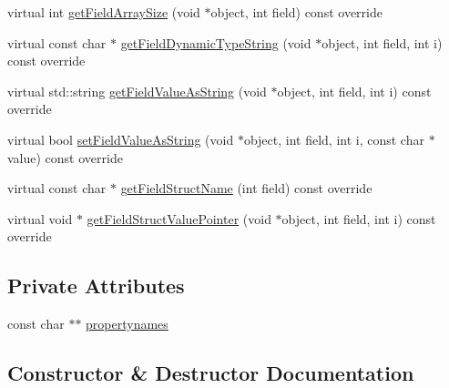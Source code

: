 \begin{DoxyCompactItemize}
\item 
virtual int \hyperlink{class_app_msg_false_dep_descriptor_a179d2851182b7e2c778befc442640361}{get\+Field\+Array\+Size} (void $\ast$object, int field) const override
\item 
virtual const char $\ast$ \hyperlink{class_app_msg_false_dep_descriptor_a18f649fae5364f7b9f326fd1ae9afb6d}{get\+Field\+Dynamic\+Type\+String} (void $\ast$object, int field, int i) const override
\item 
virtual std\+::string \hyperlink{class_app_msg_false_dep_descriptor_ac9b26b1e9c849df0e0259dfa3a38885c}{get\+Field\+Value\+As\+String} (void $\ast$object, int field, int i) const override
\item 
virtual bool \hyperlink{class_app_msg_false_dep_descriptor_ad7f784c5c9c941292342602674c4b9e4}{set\+Field\+Value\+As\+String} (void $\ast$object, int field, int i, const char $\ast$value) const override
\item 
virtual const char $\ast$ \hyperlink{class_app_msg_false_dep_descriptor_aa44a321c042bf2af6eff2f92ad52f73d}{get\+Field\+Struct\+Name} (int field) const override
\item 
virtual void $\ast$ \hyperlink{class_app_msg_false_dep_descriptor_a2975e01f5455360c1954f722dfce0924}{get\+Field\+Struct\+Value\+Pointer} (void $\ast$object, int field, int i) const override
\end{DoxyCompactItemize}
\subsection*{Private Attributes}
\begin{DoxyCompactItemize}
\item 
const char $\ast$$\ast$ \hyperlink{class_app_msg_false_dep_descriptor_a9ae1f3f2f3bd0f3647643894402add0b}{propertynames}
\end{DoxyCompactItemize}


\subsection{Constructor \& Destructor Documentation}
\mbox{\label{class_app_msg_false_dep_descriptor_a4ca99cc9f908534f473db357ba25ff2d}} 
